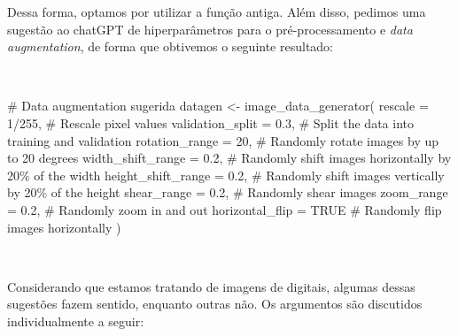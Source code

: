 \documentclass[
  a4paperpaper,
]{article}
\newenvironment{Shaded}{\begin{snugshade}}{\end{snugshade}}
\newcommand{\AttributeTok}[1]{\textcolor[rgb]{0.40,0.45,0.13}{#1}}
\newcommand{\CommentTok}[1]{\textcolor[rgb]{0.37,0.37,0.37}{#1}}
\newcommand{\ConstantTok}[1]{\textcolor[rgb]{0.56,0.35,0.01}{#1}}
\newcommand{\DecValTok}[1]{\textcolor[rgb]{0.68,0.00,0.00}{#1}}
\newcommand{\FloatTok}[1]{\textcolor[rgb]{0.68,0.00,0.00}{#1}}
\newcommand{\FunctionTok}[1]{\textcolor[rgb]{0.28,0.35,0.67}{#1}}
\newcommand{\NormalTok}[1]{\textcolor[rgb]{0.00,0.23,0.31}{#1}}
\newcommand{\OtherTok}[1]{\textcolor[rgb]{0.00,0.23,0.31}{#1}}
\newcommand{\SpecialCharTok}[1]{\textcolor[rgb]{0.37,0.37,0.37}{#1}}
\begin{document}
Dessa forma, optamos por utilizar a função antiga. Além disso, pedimos
uma sugestão ao chatGPT de hiperparâmetros para o pré-processamento e
\emph{data augmentation}, de forma que obtivemos o seguinte resultado:

~

\begin{Shaded}
\begin{Highlighting}[]
\CommentTok{\# Data augmentation sugerida}
\NormalTok{datagen }\OtherTok{\textless{}{-}} \FunctionTok{image\_data\_generator}\NormalTok{(}
  \AttributeTok{rescale =} \DecValTok{1}\SpecialCharTok{/}\DecValTok{255}\NormalTok{,               }\CommentTok{\# Rescale pixel values}
  \AttributeTok{validation\_split =} \FloatTok{0.3}\NormalTok{,        }\CommentTok{\# Split the data into training and validation}
  \AttributeTok{rotation\_range =} \DecValTok{20}\NormalTok{,           }\CommentTok{\# Randomly rotate images by up to 20 degrees}
  \AttributeTok{width\_shift\_range =} \FloatTok{0.2}\NormalTok{,       }\CommentTok{\# Randomly shift images horizontally by 20\% of the width}
  \AttributeTok{height\_shift\_range =} \FloatTok{0.2}\NormalTok{,      }\CommentTok{\# Randomly shift images vertically by 20\% of the height}
  \AttributeTok{shear\_range =} \FloatTok{0.2}\NormalTok{,             }\CommentTok{\# Randomly shear images}
  \AttributeTok{zoom\_range =} \FloatTok{0.2}\NormalTok{,              }\CommentTok{\# Randomly zoom in and out}
  \AttributeTok{horizontal\_flip =} \ConstantTok{TRUE}         \CommentTok{\# Randomly flip images horizontally}
\NormalTok{)}
\end{Highlighting}
\end{Shaded}

~

Considerando que estamos tratando de imagens de digitais, algumas dessas
sugestões fazem sentido, enquanto outras não. Os argumentos são
discutidos individualmente a seguir:
\end{document}
